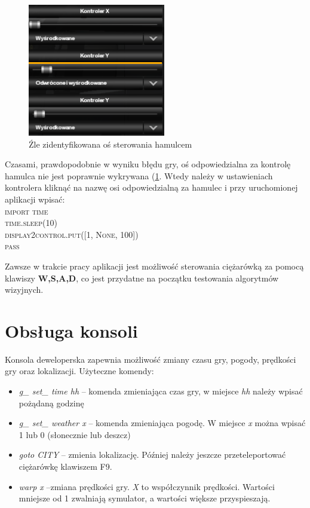 \begin{figure}
  \centering
  \includegraphics[width=6cm]{img/appendix1_bad_controller.png}
  \caption{Źle zidentyfikowana oś sterowania hamulcem}
  \label{fig:appendix1_bad_controller}
\end{figure}

Czasami, prawdopodobnie w wyniku błędu gry, oś odpowiedzialna za kontrolę hamulca nie jest poprawnie wykrywana (\ref{fig:appendix1_bad_controller}. Wtedy należy w ustawieniach kontrolera kliknąć na nazwę osi odpowiedzialną za hamulec i przy uruchomionej aplikacji wpisać:\\ \textsc{import time \\
time.sleep(10)\\
display2control.put([1, None, 100])\\
pass\\}

Zawsze w trakcie pracy aplikacji jest możliwość sterowania ciężarówką za pomocą klawiszy \textbf{W,S,A,D}, co jest przydatne na początku testowania algorytmów wizyjnych.

\section{Obsługa konsoli}
Konsola deweloperska zapewnia możliwość zmiany czasu gry, pogody, prędkości gry oraz lokalizacji. Użyteczne komendy:
\begin{itemize}
\item \textit{g\_ set\_ time hh} -- komenda zmieniająca czas gry, w miejsce \textit{hh} należy wpisać pożądaną godzinę
\item \textit{g\_ set\_ weather x} -- komenda zmieniająca pogodę. W miejsce \textit{x} można wpisać 1 lub 0 (słonecznie lub deszcz)
\item \textit{goto CITY} -- zmienia lokalizację. Później należy jeszcze przeteleportować ciężarówkę klawiszem F9.
\item \textit{warp x} --zmiana prędkości gry. \textit{X} to współczynnik prędkości. Wartości mniejsze od 1 zwalniają symulator, a wartości większe przyspieszają.
\end{itemize}
